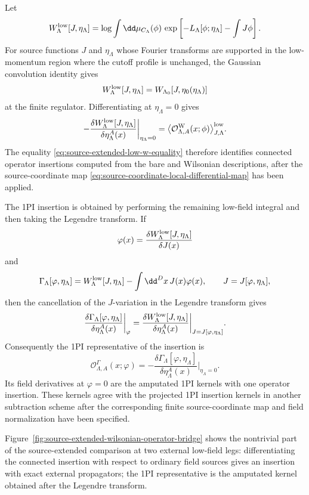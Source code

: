 Let
\[
  W_\Lambda^{\rm low}[J,\eta_\Lambda]
  =
  \log
  \int\dd\mu_{C_\Lambda}(\phi)\,
  \exp\left[
    -L_\Lambda[\phi;\eta_\Lambda]
    -\int J\phi
  \right].
\]
For source functions \(J\) and \(\eta_\Lambda\) whose Fourier transforms are
supported in the low-momentum region where the cutoff profile is unchanged,
the Gaussian convolution identity gives
\begin{equation}
  W_\Lambda^{\rm low}[J,\eta_\Lambda]
  =
  W_{\Lambda_0}[J,\eta_0(\eta_\Lambda)]
  \label{eq:source-extended-low-w-equality}
\end{equation}
at the finite regulator.  Differentiating at \(\eta_\Lambda=0\) gives
\[
  -\frac{\delta W_\Lambda^{\rm low}[J,\eta_\Lambda]}
          {\delta\eta_\Lambda^A(x)}
  \bigg|_{\eta_\Lambda=0}
  =
  \bigl\langle
    \mathcal O_{\Lambda,A}^{\rm W}(x;\phi)
  \bigr\rangle_{J,\Lambda}^{\rm low}.
\]
The equality
\eqref{eq:source-extended-low-w-equality} therefore identifies connected
operator insertions computed from the bare and Wilsonian descriptions, after
the source-coordinate map \eqref{eq:source-coordinate-local-differential-map}
has been applied.

The 1PI insertion is obtained by performing the remaining low-field integral
and then taking the Legendre transform.  If
\[
  \varphi(x)=\frac{\delta W_\Lambda^{\rm low}[J,\eta_\Lambda]}
                  {\delta J(x)}
\]
and
\[
  \Gamma_\Lambda[\varphi,\eta_\Lambda]
  =
  W_\Lambda^{\rm low}[J,\eta_\Lambda]
  -
  \int\dd^D x\,J(x)\varphi(x),
  \qquad
  J=J[\varphi,\eta_\Lambda],
\]
then the cancellation of the \(J\)-variation in the Legendre transform gives
\[
  \frac{\delta\Gamma_\Lambda[\varphi,\eta_\Lambda]}
       {\delta\eta_\Lambda^A(x)}
  \bigg|_{\varphi}
  =
  \frac{\delta W_\Lambda^{\rm low}[J,\eta_\Lambda]}
       {\delta\eta_\Lambda^A(x)}
  \bigg|_{J=J[\varphi,\eta_\Lambda]} .
\]
Consequently the 1PI representative of the insertion is
\[
  \mathcal O_{\Lambda,A}^{\Gamma}(x;\varphi)
  =
  -\frac{\delta\Gamma_\Lambda[\varphi,\eta_\Lambda]}
        {\delta\eta_\Lambda^A(x)}
  \bigg|_{\eta_\Lambda=0}.
\]
Its field derivatives at \(\varphi=0\) are the amputated 1PI kernels with one
operator insertion.  These kernels agree with the projected 1PI insertion
kernels in another subtraction scheme after the corresponding finite
source-coordinate map and field normalization have been specified.

Figure~\ref{fig:source-extended-wilsonian-operator-bridge} shows the
nontrivial part of the source-extended comparison at two external low-field
legs: differentiating the connected insertion with respect to ordinary field
sources gives an insertion with exact external propagators; the 1PI
representative is the amputated kernel obtained after the Legendre transform.

